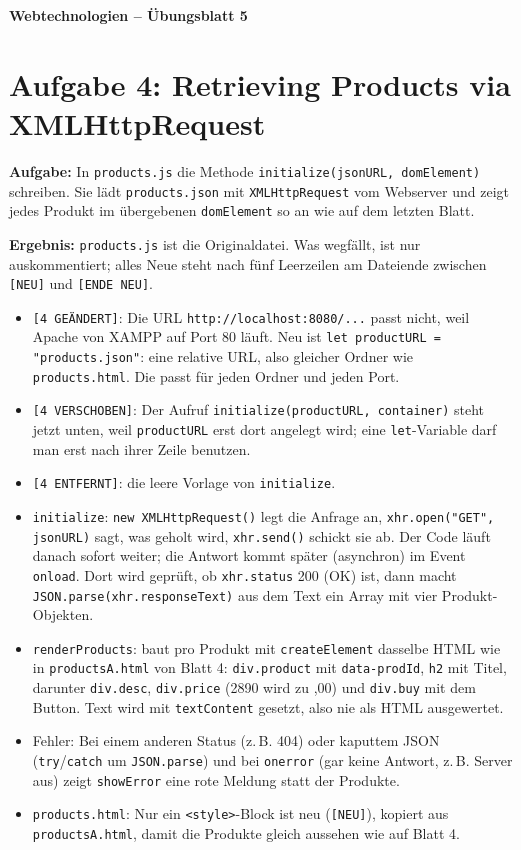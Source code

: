 \documentclass[11pt,a4paper]{article}
\begin{document}
\begin{center}
  {\Large\textbf{Webtechnologien -- Übungsblatt 5}}
\end{center}
\section*{Aufgabe 4: Retrieving Products via XMLHttpRequest}
\textbf{Aufgabe:} In \texttt{products.js} die Methode
\texttt{initialize(jsonURL, domElement)} schreiben. Sie lädt
\texttt{products.json} mit \texttt{XMLHttpRequest} vom Webserver und
zeigt jedes Produkt im übergebenen \texttt{domElement} so an wie auf dem
letzten Blatt.

\medskip
\textbf{Ergebnis:} \texttt{products.js} ist die Originaldatei. Was wegfällt,
ist nur auskommentiert; alles Neue steht nach fünf Leerzeilen am
Dateiende zwischen \texttt{[NEU]} und \texttt{[ENDE NEU]}.
\begin{itemize}
  \item \texttt{[4 GEÄNDERT]}: Die URL \texttt{http://localhost:8080/...}
    passt nicht, weil Apache von XAMPP auf Port 80 läuft. Neu ist
    \texttt{let productURL = "products.json"}: eine relative URL, also
    \glqq gleicher Ordner wie \texttt{products.html}\grqq. Die passt für
    jeden Ordner und jeden Port.
  \item \texttt{[4 VERSCHOBEN]}: Der Aufruf
    \texttt{initialize(productURL, container)} steht jetzt unten, weil
    \texttt{productURL} erst dort angelegt wird; eine
    \texttt{let}-Variable darf man erst nach ihrer Zeile benutzen.
  \item \texttt{[4 ENTFERNT]}: die leere Vorlage von \texttt{initialize}.
  \item \texttt{initialize}: \texttt{new XMLHttpRequest()} legt die
    Anfrage an, \texttt{xhr.open("GET", jsonURL)} sagt, was geholt wird,
    \texttt{xhr.send()} schickt sie ab. Der Code läuft danach sofort
    weiter; die Antwort kommt später (asynchron) im Event
    \texttt{onload}. Dort wird geprüft, ob \texttt{xhr.status} 200 (OK)
    ist, dann macht \texttt{JSON.parse(xhr.responseText)} aus dem Text
    ein Array mit vier Produkt-Objekten.
  \item \texttt{renderProducts}: baut pro Produkt mit
    \texttt{createElement} dasselbe HTML wie in \texttt{productsA.html}
    von Blatt 4: \texttt{div.product} mit \texttt{data-prodId},
    \texttt{h2} mit Titel, darunter \texttt{div.desc},
    \texttt{div.price} (2890 wird zu ,00\grqq) und
    \texttt{div.buy} mit dem Button. Text wird mit
    \texttt{textContent} gesetzt, also nie als HTML ausgewertet.
  \item Fehler: Bei einem anderen Status (z.\,B. 404) oder kaputtem JSON
    (\texttt{try}/\texttt{catch} um \texttt{JSON.parse}) und bei
    \texttt{onerror} (gar keine Antwort, z.\,B. Server aus) zeigt
    \texttt{showError} eine rote Meldung statt der Produkte.
  \item \texttt{products.html}: Nur ein \texttt{<style>}-Block ist neu
    (\texttt{[NEU]}), kopiert aus \texttt{productsA.html}, damit die
    Produkte gleich aussehen wie auf Blatt 4.
\end{itemize}
\end{document}
